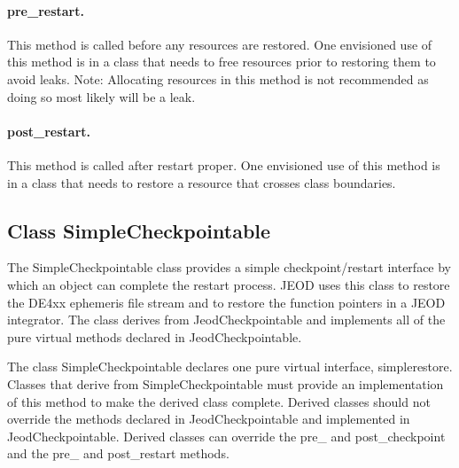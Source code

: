 \paragraph{pre\_restart.}
This method is called before any resources are restored.
One envisioned use of this method is in a class that needs to free resources
prior to restoring them to avoid leaks. Note: Allocating resources in this
method is not recommended as doing so most likely will be a leak.
\paragraph{post\_restart.}
This method is called after restart proper.
One envisioned use of this method is in a class that needs to restore a
resource that crosses class boundaries.

\subsection{Class SimpleCheckpointable}
The SimpleCheckpointable class provides a simple checkpoint/restart interface
by which an object can complete the restart process. JEOD uses this class to
restore the DE4xx ephemeris file stream and to restore the function pointers
in a JEOD integrator.
The class derives from JeodCheckpointable and implements all of the pure virtual
methods declared in JeodCheckpointable.

The class SimpleCheckpointable declares one pure virtual interface,
simple\funder{}restore. Classes that
derive from SimpleCheckpointable must provide an implementation of this
method to make the derived class complete. Derived classes should not
override the methods declared in JeodCheckpointable and implemented in
JeodCheckpointable. Derived classes can override the pre\_ and post\_checkpoint
and the pre\_ and post\_restart methods.


